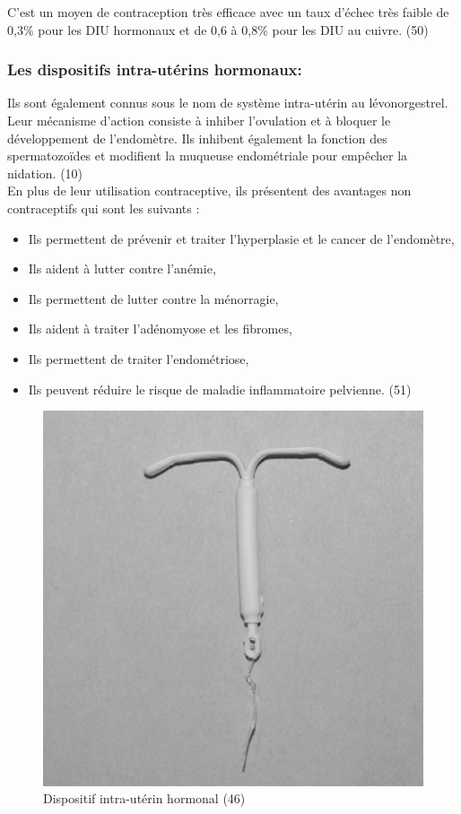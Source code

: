 \noindent C’est un moyen de contraception très efficace avec un taux d’échec très faible de 0,3\% pour les DIU hormonaux et de 0,6 à 0,8\% pour les DIU au cuivre. (50)

\subsubsection{Les dispositifs intra-utérins hormonaux:}
\noindent Ils sont également connus sous le nom de système intra-utérin au lévonorgestrel. Leur mécanisme d’action consiste à inhiber l’ovulation et à bloquer le développement de l’endomètre. Ils inhibent également la fonction des spermatozoïdes et modifient la muqueuse endométriale pour empêcher la nidation. (10)\\

\noindent En plus de leur utilisation contraceptive, ils présentent des avantages non contraceptifs qui sont les suivants : 

\begin{itemize}[label={$\bullet$}, align=right]
  \item Ils permettent de prévenir et traiter l’hyperplasie et le cancer de l’endomètre, 
  \item	Ils aident à lutter contre l’anémie, 
  \item Ils permettent de lutter contre la ménorragie,
  \item Ils aident à traiter l’adénomyose et les fibromes, 
  \item Ils permettent de traiter l’endométriose,
  \item Ils peuvent réduire le risque de maladie inflammatoire pelvienne. (51)
\end{itemize}

\begin{figure}[H]
  \centering
  \includegraphics{Images/fig_24.jpg}
  \caption{Dispositif intra-utérin hormonal (46)}
\end{figure}

